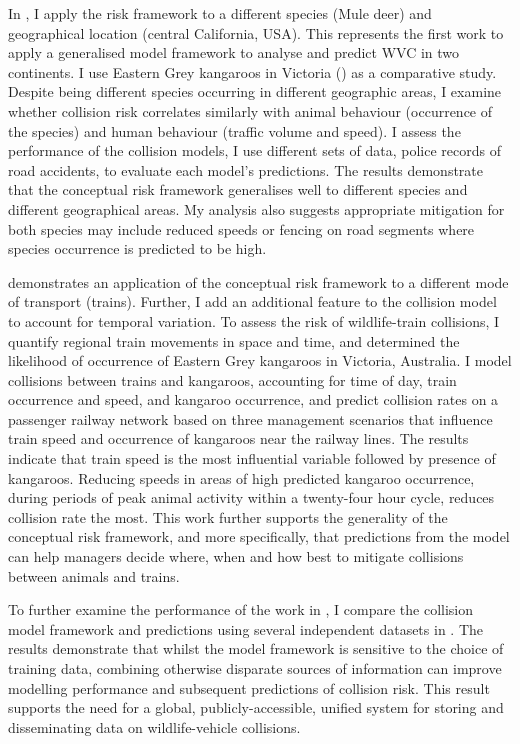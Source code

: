 \documentclass[titlesmallcaps,copyrightpage,examinerscopy]{uomthesis}
\begin{document}
In , I apply the risk framework to a different species (Mule deer) and geographical location (central California, USA). This represents the first work to apply a generalised model framework to analyse and predict WVC in two continents. I use Eastern Grey kangaroos in Victoria () as a comparative study. Despite being different species occurring in different geographic areas, I examine whether collision risk correlates similarly with animal behaviour (occurrence of the species) and human behaviour (traffic volume and speed). I assess the performance of the collision models, I use different sets of data, police records of road accidents, to evaluate each model's predictions. The results demonstrate that the conceptual risk framework generalises well to different species and different geographical areas. My analysis also suggests appropriate mitigation for both species may include reduced speeds or fencing on road segments where species occurrence is predicted to be high.

 demonstrates an application of the conceptual risk framework to a different mode of transport (trains). Further, I add an additional feature to the collision model to account for temporal variation. To assess the risk of wildlife-train collisions, I quantify regional train movements in space and time, and determined the likelihood of occurrence of Eastern Grey kangaroos in Victoria, Australia. I model collisions between trains and kangaroos, accounting for time of day, train occurrence and speed, and kangaroo occurrence, and predict collision rates on a passenger railway network based on three management scenarios that influence train speed and occurrence of kangaroos near the railway lines. The results indicate that train speed is the most influential variable followed by presence of kangaroos.  Reducing speeds in areas of high predicted kangaroo occurrence, during periods of peak animal activity within a twenty-four hour cycle, reduces collision rate the most. This work further supports the generality of the conceptual risk framework, and more specifically, that predictions from the model can help managers decide where, when and how best to mitigate collisions between animals and trains.

To further examine the performance of the work in , I compare the collision model framework and predictions using several independent datasets in . The results demonstrate that whilst the model framework is sensitive to the choice of training data, combining otherwise disparate sources of information can improve modelling performance and subsequent predictions of collision risk. This result supports the need for a global, publicly-accessible, unified system for storing and disseminating data on wildlife-vehicle collisions.
\end{document}
